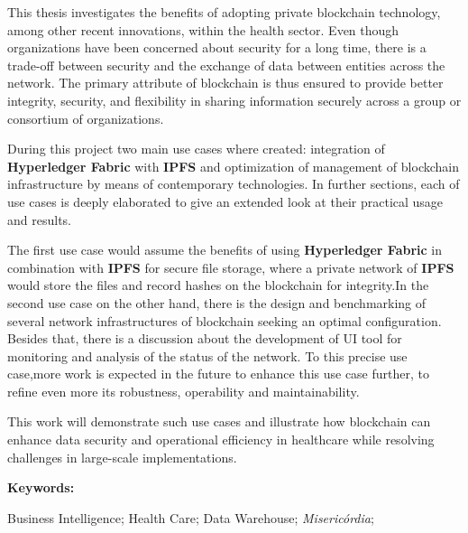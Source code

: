 This thesis investigates the benefits of adopting private blockchain technology, among other recent innovations, within the health sector. Even though organizations have been concerned about security for a long time, there is a trade-off between security and the exchange of data between entities across the network. The primary attribute of blockchain is thus ensured to provide better integrity, security, and flexibility in sharing information securely across a group or consortium of organizations.

During this project two main use cases where created: integration of \textbf{Hyperledger Fabric} with \textbf{IPFS}  and optimization of management of blockchain infrastructure by means of contemporary technologies. In further sections, each of use cases is deeply elaborated to give an extended look at their practical usage and results.

The first use case would assume the benefits of using \textbf{Hyperledger Fabric} in combination with \textbf{IPFS} for secure file storage, where a private network of \textbf{IPFS} would store the files and record hashes on the blockchain for integrity.In the second use case on the other hand, there is the design and benchmarking of several network infrastructures of blockchain seeking an optimal configuration. Besides that, there is a discussion about the development of UI tool for monitoring and analysis of the status of the network. To this precise use case,more work is expected in the future to enhance this use case further, to refine even more its robustness, operability and maintainability.

This work will demonstrate such use cases and illustrate how blockchain can enhance data security and operational efficiency in healthcare while resolving challenges in large-scale implementations.

\vspace{1cm} %
\textbf{Keywords:} \parbox[t]{0.85\textwidth}{\raggedright Business Intelligence; Health Care; Data Warehouse; \textit{Misericórdia};}
\medskip

\pagebreak